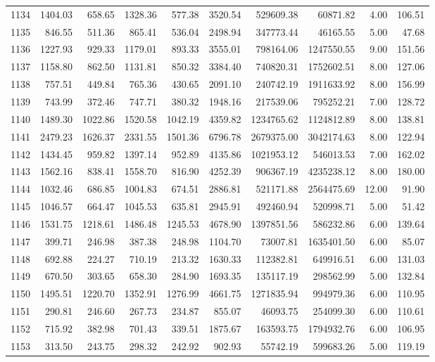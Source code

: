 \begin{tabular}{lrrrrrrrrr}
1134 & 1404.03 & 658.65 & 1328.36 & 577.38 & 3520.54 & 529609.38 & 60871.82 & 4.00 & 106.51 \\
1135 & 846.55 & 511.36 & 865.41 & 536.04 & 2498.94 & 347773.44 & 46165.55 & 5.00 & 47.68 \\
1136 & 1227.93 & 929.33 & 1179.01 & 893.33 & 3555.01 & 798164.06 & 1247550.55 & 9.00 & 151.56 \\
1137 & 1158.80 & 862.50 & 1131.81 & 850.32 & 3384.40 & 740820.31 & 1752602.51 & 8.00 & 127.06 \\
1138 & 757.51 & 449.84 & 765.36 & 430.65 & 2091.10 & 240742.19 & 1911633.92 & 8.00 & 156.99 \\
1139 & 743.99 & 372.46 & 747.71 & 380.32 & 1948.16 & 217539.06 & 795252.21 & 7.00 & 128.72 \\
1140 & 1489.30 & 1022.86 & 1520.58 & 1042.19 & 4359.82 & 1234765.62 & 1124812.89 & 8.00 & 138.81 \\
1141 & 2479.23 & 1626.37 & 2331.55 & 1501.36 & 6796.78 & 2679375.00 & 3042174.63 & 8.00 & 122.94 \\
1142 & 1434.45 & 959.82 & 1397.14 & 952.89 & 4135.86 & 1021953.12 & 546013.53 & 7.00 & 162.02 \\
1143 & 1562.16 & 838.41 & 1558.70 & 816.90 & 4252.39 & 906367.19 & 4235238.12 & 8.00 & 180.00 \\
1144 & 1032.46 & 686.85 & 1004.83 & 674.51 & 2886.81 & 521171.88 & 2564475.69 & 12.00 & 91.90 \\
1145 & 1046.57 & 664.47 & 1045.53 & 635.81 & 2945.91 & 492460.94 & 520998.71 & 5.00 & 51.42 \\
1146 & 1531.75 & 1218.61 & 1486.48 & 1245.53 & 4678.90 & 1397851.56 & 586232.86 & 6.00 & 139.64 \\
1147 & 399.71 & 246.98 & 387.38 & 248.98 & 1104.70 & 73007.81 & 1635401.50 & 6.00 & 85.07 \\
1148 & 692.88 & 224.27 & 710.19 & 213.32 & 1630.33 & 112382.81 & 649916.51 & 6.00 & 131.03 \\
1149 & 670.50 & 303.65 & 658.30 & 284.90 & 1693.35 & 135117.19 & 298562.99 & 5.00 & 132.84 \\
1150 & 1495.51 & 1220.70 & 1352.91 & 1276.99 & 4661.75 & 1271835.94 & 994979.36 & 6.00 & 110.95 \\
1151 & 290.81 & 246.60 & 267.73 & 234.87 & 855.07 & 46093.75 & 254099.30 & 6.00 & 110.61 \\
1152 & 715.92 & 382.98 & 701.43 & 339.51 & 1875.67 & 163593.75 & 1794932.76 & 6.00 & 106.95 \\
1153 & 313.50 & 243.75 & 298.32 & 242.92 & 902.93 & 55742.19 & 599683.26 & 5.00 & 119.19 \\

\end{tabular}
